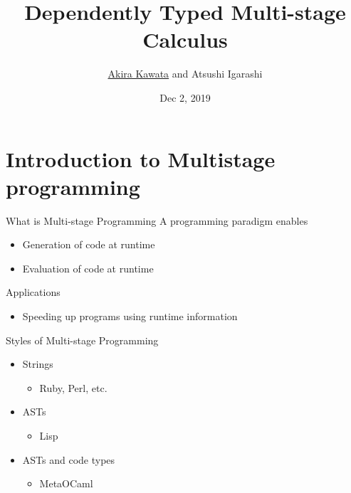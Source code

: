 \documentclass[dvipdfmx,aspectratio=169, 20pt]{beamer}
\title{Dependently Typed Multi-stage Calculus}
\author{\underline{Akira Kawata} and Atsushi Igarashi}
\institute{Gradudate School of Informatics, Kyoto University}
\date{Dec 2, 2019}
\begin{document}
\maketitle


\section{Introduction to Multistage programming}

\begin{frame}[fragile]{What is Multi-stage Programming}
    A programming paradigm enables
    \begin{itemize}
        \item Generation of code at runtime
        \item Evaluation of code at runtime
    \end{itemize}
    Applications
    \begin{itemize}
        \item Speeding up programs using runtime information
    \end{itemize}
    \note{
    }
\end{frame}

\begin{frame}[fragile]{Styles of Multi-stage Programming}
    \begin{itemize}
        \item Strings
            \begin{itemize}
                    \item Ruby, Perl, etc.
            \end{itemize}
        \item ASTs
            \begin{itemize}
                    \item Lisp
            \end{itemize}
        \item ASTs and code types
            \begin{itemize}
                    \item MetaOCaml
            \end{itemize}
    \end{itemize}
\end{frame}
\end{document}
